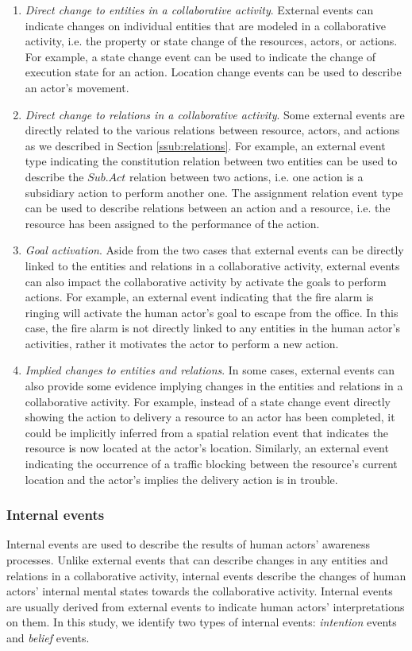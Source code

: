  \begin{enumerate}
 	\item \emph{Direct change to entities in a collaborative activity}. External events can indicate changes on individual entities that are modeled in a collaborative activity, i.e. the property or state change of the resources, actors, or actions. For example, a state change event can be used to indicate the change of execution state for an action. Location change events can be used to describe an actor's movement. 
 	\item \emph{Direct change to relations in a collaborative activity}. Some external events are directly related to the various relations between resource, actors, and actions as we described in Section \ref{ssub:relations}. For example, an external event type indicating the constitution relation between two entities can be used to describe the $Sub.Act$ relation between two actions, i.e. one action is a subsidiary action to perform another one. The assignment relation event type can be used to describe relations between an action and a resource, i.e. the resource has been assigned to the performance of the action. 
 	\item \emph{Goal activation}. Aside from the two cases that external events can be directly linked to the entities and relations in a collaborative activity, external events can also impact the collaborative activity by activate the goals to perform actions. For example, an external event indicating that the fire alarm is ringing will activate the human actor's goal to escape from the office. In this case, the fire alarm is not directly linked to any entities in the human actor's activities, rather it motivates the actor to perform a new action.
 	\item \emph{Implied changes to entities and relations}. In some cases, external events can also provide some evidence implying changes in the entities and relations in a collaborative activity. For example, instead of a state change event directly showing the action to delivery a resource to an actor has been completed, it could be implicitly inferred from a spatial relation event that indicates the resource is now located at the actor's location. Similarly, an external event indicating the occurrence of a traffic blocking between the resource's current location and the actor's implies the delivery action is in trouble.
 \end{enumerate}
\subsubsection{Internal events} %
\label{ssub:internal_events}
Internal events are used to describe the results of human actors' awareness processes. Unlike external events that can describe changes in any entities and relations in a collaborative activity, internal events describe the changes of human actors' internal mental states towards the collaborative activity. Internal events are usually derived from external events to indicate human actors' interpretations on them. In this study, we identify two types of internal events: \emph{intention} events and \emph{belief} events. 

